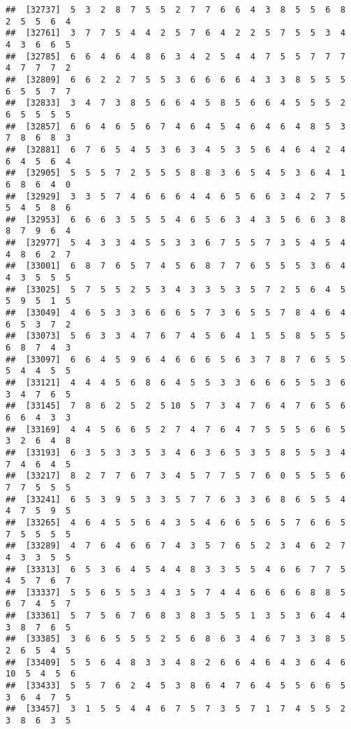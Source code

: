 \documentclass[
]{book}
\begin{document}
\begin{verbatim}
##  [32737]  5  3  2  8  7  5  5  2  7  7  6  6  4  3  8  5  5  6  8  2  5  5  6  4
##  [32761]  3  7  7  5  4  4  2  5  7  6  4  2  2  5  7  5  5  3  4  4  3  6  6  5
##  [32785]  6  6  4  6  4  8  6  3  4  2  5  4  4  7  5  5  7  7  7  4  7  7  7  2
##  [32809]  6  6  2  2  7  5  5  3  6  6  6  6  4  3  3  8  5  5  5  6  5  5  7  7
##  [32833]  3  4  7  3  8  5  6  6  4  5  8  5  6  6  4  5  5  5  2  6  5  5  5  5
##  [32857]  6  6  4  6  5  6  7  4  6  4  5  4  6  4  6  4  8  5  3  7  8  6  8  3
##  [32881]  6  7  6  5  4  5  3  6  3  4  5  3  5  6  4  6  4  2  4  6  4  5  6  4
##  [32905]  5  5  5  7  2  5  5  5  8  8  3  6  5  4  5  3  6  4  1  6  8  6  4  0
##  [32929]  3  3  5  7  4  6  6  6  4  4  6  5  6  6  3  4  2  7  5  5  4  5  8  6
##  [32953]  6  6  6  3  5  5  5  4  6  5  6  3  4  3  5  6  6  3  8  8  7  9  6  4
##  [32977]  5  4  3  3  4  5  5  3  3  6  7  5  5  7  3  5  4  5  4  4  8  6  2  7
##  [33001]  6  8  7  6  5  7  4  5  6  8  7  7  6  5  5  5  3  6  4  4  3  5  5  5
##  [33025]  5  7  5  5  2  5  3  4  3  3  5  3  5  7  2  5  6  4  5  5  9  5  1  5
##  [33049]  4  6  5  3  3  6  6  6  5  7  3  6  5  5  7  8  4  6  4  6  5  3  7  2
##  [33073]  5  6  3  3  4  7  6  7  4  5  6  4  1  5  5  8  5  5  5  6  8  7  4  3
##  [33097]  6  6  4  5  9  6  4  6  6  6  5  6  3  7  8  7  6  5  5  5  4  4  5  5
##  [33121]  4  4  4  5  6  8  6  4  5  5  3  3  6  6  6  5  5  3  6  3  4  7  6  5
##  [33145]  7  8  6  2  5  2  5 10  5  7  3  4  7  6  4  7  6  5  6  6  6  4  3  3
##  [33169]  4  4  5  6  6  5  2  7  4  7  6  4  7  5  5  5  6  6  5  3  2  6  4  8
##  [33193]  6  3  5  3  3  5  3  4  6  3  6  5  3  5  8  5  5  3  4  7  4  6  4  5
##  [33217]  8  2  7  7  6  7  3  4  5  7  7  5  7  6  0  5  5  5  6  7  7  5  5  5
##  [33241]  6  5  3  9  5  3  3  5  7  7  6  3  3  6  8  6  5  5  4  4  7  5  9  5
##  [33265]  4  6  4  5  5  6  4  3  5  4  6  6  5  6  5  7  6  6  5  7  5  5  5  5
##  [33289]  4  7  6  4  6  6  7  4  3  5  7  6  5  2  3  4  6  2  7  4  3  3  5  5
##  [33313]  6  5  3  6  4  5  4  4  8  3  3  5  5  4  6  6  7  7  5  4  5  7  6  7
##  [33337]  5  5  6  5  5  3  4  3  5  7  4  4  6  6  6  6  8  8  5  6  7  4  5  7
##  [33361]  5  7  5  6  7  6  8  3  8  3  5  5  1  3  5  3  6  4  4  3  8  7  6  5
##  [33385]  3  6  6  5  5  5  2  5  6  8  6  3  4  6  7  3  3  8  5  2  6  5  4  5
##  [33409]  5  5  6  4  8  3  3  4  8  2  6  6  4  6  4  3  6  4  6 10  5  4  5  6
##  [33433]  5  5  7  6  2  4  5  3  8  6  4  7  6  4  5  5  6  6  5  3  6  4  7  5
##  [33457]  3  1  5  5  4  4  6  7  5  7  3  5  7  1  7  4  5  5  2  3  8  6  3  5

\end{verbatim}
\end{document}
